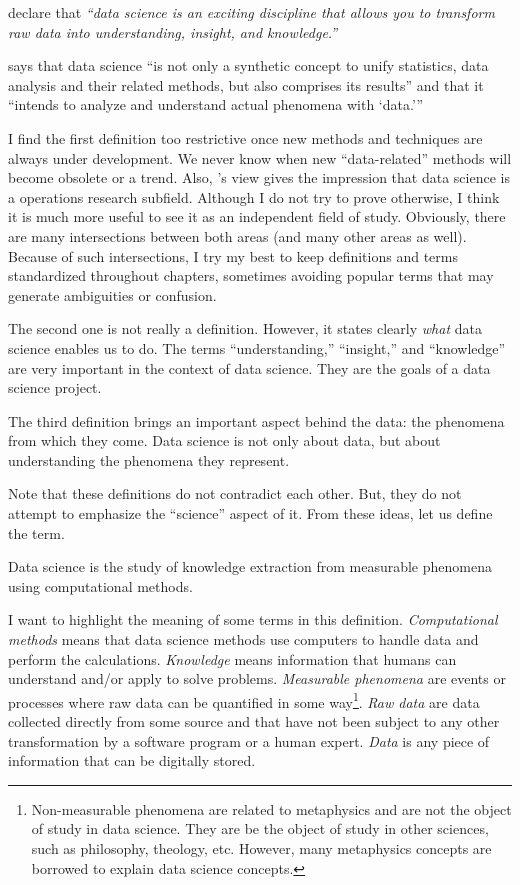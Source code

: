 \textcite{Wickham2023} declare that \emph{``data science is an exciting discipline that
allows you to transform raw data into understanding, insight, and knowledge.''}

\textcite{Hayashi1998} says that data science ``is not only a
synthetic concept to unify statistics, data analysis and their related methods, but also
comprises its results'' and that it ``intends to analyze and understand actual phenomena
with `data.'{}''

I find the first definition too restrictive once new methods and techniques are always
under development.  We never know when new ``data-related'' methods will become obsolete
or a trend.  Also, \citeauthor{Zumel2019}'s view gives the impression that data science is a
operations research subfield.  Although I do not try to prove otherwise, I think it
is much more useful to see it as an independent field of study.  Obviously, there are
many intersections between both areas (and many other areas as well).  Because of such
intersections, I try my best to keep definitions and
terms standardized throughout chapters, sometimes avoiding popular terms that may generate
ambiguities or confusion.

The second one is not really a definition.  However, it states clearly \emph{what} data
science enables us to do.  The terms ``understanding,'' ``insight,'' and ``knowledge'' are
very important in the context of data science.  They are the goals of a data science
project.

The third definition brings an important aspect behind the data: the phenomena from which
they come.  Data science is not only about data, but about understanding the phenomena
they represent.

Note that these definitions do not contradict each other.  But, they do not attempt to
emphasize the ``science'' aspect of it.  From these ideas, let us define the term.

\begin{definition}
  \label{def:ds}
  Data science is the study of knowledge extraction from
  measurable phenomena using computational methods.
\end{definition}

I want to highlight the meaning of some terms in this definition.  \emph{Computational methods} means
that data science methods use computers to handle data and perform the calculations.
\emph{Knowledge} means information that humans can understand and/or apply to solve
problems.  \emph{Measurable phenomena} are events or processes where raw data can be
quantified in some way\footnote{%
  Non-measurable phenomena are related to metaphysics and are not the object of study in
  data science.  They are be the object of study in other sciences, such as
  philosophy, theology, etc.  However, many metaphysics concepts are borrowed to
  explain data science concepts.%
}.  \emph{Raw data} are data collected directly from some source and
that have not been subject to any other transformation by a software program or a human
expert.  \emph{Data} is any piece of information that can be digitally stored.


